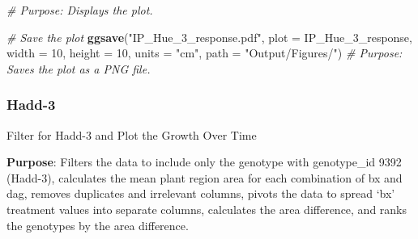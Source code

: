\documentclass[
  11pt,
]{article}
\newenvironment{Shaded}{\begin{snugshade}}{\end{snugshade}}
\newcommand{\AttributeTok}[1]{\textcolor[rgb]{0.13,0.29,0.53}{#1}}
\newcommand{\CommentTok}[1]{\textcolor[rgb]{0.56,0.35,0.01}{\textit{#1}}}
\newcommand{\DecValTok}[1]{\textcolor[rgb]{0.00,0.00,0.81}{#1}}
\newcommand{\FunctionTok}[1]{\textcolor[rgb]{0.13,0.29,0.53}{\textbf{#1}}}
\newcommand{\NormalTok}[1]{#1}
\newcommand{\StringTok}[1]{\textcolor[rgb]{0.31,0.60,0.02}{#1}}
\begin{document}
\begin{Shaded}
\begin{Highlighting}[]
\CommentTok{\# Purpose: Displays the plot.}

\CommentTok{\# Save the plot}
\FunctionTok{ggsave}\NormalTok{(}\StringTok{"IP\_Hue\_3\_response.pdf"}\NormalTok{, }\AttributeTok{plot =}\NormalTok{ IP\_Hue\_3\_response, }\AttributeTok{width =} \DecValTok{10}\NormalTok{, }\AttributeTok{height =} \DecValTok{10}\NormalTok{, }\AttributeTok{units =} \StringTok{"cm"}\NormalTok{, }\AttributeTok{path =} \StringTok{"Output/Figures/"}\NormalTok{)}
\CommentTok{\# Purpose: Saves the plot as a PNG file.}
\end{Highlighting}
\end{Shaded}

\subsubsection{Hadd-3}\label{hadd-3}

Filter for Hadd-3 and Plot the Growth Over Time

\textbf{Purpose}: Filters the data to include only the genotype with
genotype\_id 9392 (Hadd-3), calculates the mean plant region area for
each combination of bx and dag, removes duplicates and irrelevant
columns, pivots the data to spread `bx' treatment values into separate
columns, calculates the area difference, and ranks the genotypes by the
area difference.
\end{document}
